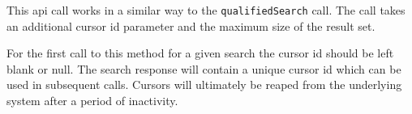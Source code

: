 This api call works in a similar way to the \verb+qualifiedSearch+ call. The
call takes an additional cursor id parameter and the maximum size of the result set.

For the first call to this method for a given search the cursor id should be left blank or null. The search response
will contain a unique cursor id which can be used in subsequent calls. Cursors will ultimately be reaped from
the underlying system after a period of inactivity.
